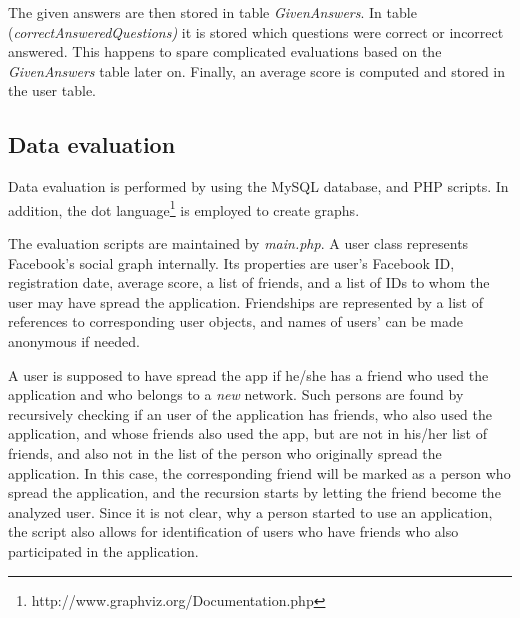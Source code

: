 \documentclass[preprint,12pt]{elsarticle}
\begin{document}
The given answers are then stored in table \textit{GivenAnswers}. In
table (\textit{correctAnsweredQuestions)} it is stored which questions
were correct or incorrect answered. This happens to spare complicated
evaluations based on the \textit{GivenAnswers} table later on.
Finally, an average score is computed and stored in the user table.



\subsection{Data evaluation}
\label{sec:data-evaluation}
Data evaluation is performed by using the MySQL database, and
PHP scripts. In addition, the dot
language\footnote{http://www.graphviz.org/Documentation.php} is employed
to create graphs. 


The evaluation scripts are maintained by \textit{main.php}. A user
class represents Facebook's social graph internally. Its properties
are user's Facebook ID, registration date, average score, a list of
friends, and a list of IDs to whom the user may have spread the
application. Friendships are represented by a list of references to corresponding
user objects, and names of users' can be made anonymous if needed.

A user is supposed to have spread the app if he/she has
a friend who used the application and who belongs to a \textit{new}
network. Such persons are found by recursively checking if an user of
the application has friends, who also used the application, and whose friends
also used the app, but are not in his/her list of friends, and also not in the list of the person
who originally spread the application. In this case, the corresponding
friend will be marked as a person who spread the application, and the
recursion starts by letting the friend become the analyzed user.
Since it is not clear, why a person started to use an application, the
script also allows for identification of users who have friends 
who also participated in the application. 
\end{document}
